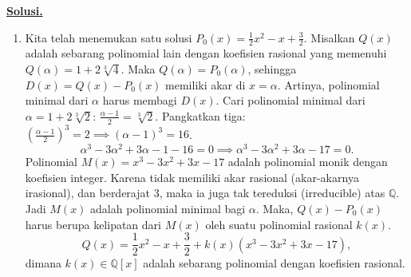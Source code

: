 \documentclass[12pt,twoside]{article}
\newenvironment{solution}
{
	\par\noindent\textbf{\underline{Solusi.}}\\
}
{
	\par
}
\begin{document}
\begin{enumerate}
\begin{solution}
\begin{enumerate}
            \item[(b)] Kita telah menemukan satu solusi $P_0(x) = \frac{1}{2}x^2 - x + \frac{3}{2}$.
                  Misalkan $Q(x)$ adalah sebarang polinomial lain dengan koefisien rasional yang memenuhi $Q(\alpha) = 1+2\sqrt[3]{4}$.
                  Maka $Q(\alpha) = P_0(\alpha)$, sehingga $D(x) = Q(x) - P_0(x)$ memiliki akar di $x=\alpha$.
                  Artinya, polinomial minimal dari $\alpha$ harus membagi $D(x)$.
                  Cari polinomial minimal dari $\alpha = 1 + 2\sqrt[3]{2}$:
                  $\frac{\alpha-1}{2} = \sqrt[3]{2}$.
                  Pangkatkan tiga: $\left(\frac{\alpha-1}{2}\right)^3 = 2 \implies (\alpha-1)^3 = 16$.
                  $$ \alpha^3 - 3\alpha^2 + 3\alpha - 1 - 16 = 0 \implies \alpha^3 - 3\alpha^2 + 3\alpha - 17 = 0. $$
                  Polinomial $M(x) = x^3 - 3x^2 + 3x - 17$ adalah polinomial monik dengan koefisien integer. Karena tidak memiliki akar rasional (akar-akarnya irasional), dan berderajat 3, maka ia juga tak tereduksi (irreducible) atas $\mathbb{Q}$.
                  Jadi $M(x)$ adalah polinomial minimal bagi $\alpha$.
                  Maka, $Q(x) - P_0(x)$ harus berupa kelipatan dari $M(x)$ oleh suatu polinomial rasional $k(x)$.
                  $$ Q(x) = \frac{1}{2}x^2 - x + \frac{3}{2} + k(x)(x^3 - 3x^2 + 3x - 17), $$
                  dimana $k(x) \in \mathbb{Q}[x]$ adalah sebarang polinomial dengan koefisien rasional.
          \end{enumerate}
        \end{solution}


\end{enumerate}
\end{document}
